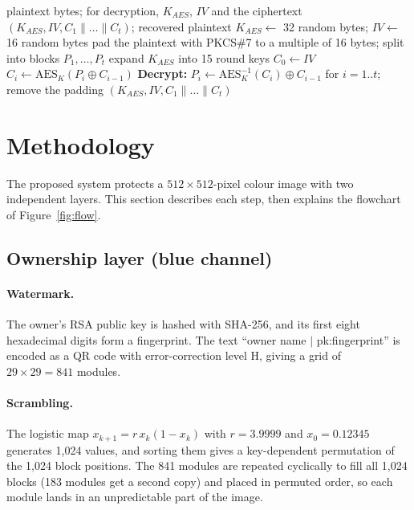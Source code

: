 \documentclass[11pt,a4paper]{article}
\begin{document}
\begin{algorithm}[!htbp]
\caption{AES-256-CBC encryption and decryption}\label{alg:aes}
\begin{algorithmic}[1]
\Require plaintext bytes; for decryption, $K_{AES}$, $IV$ and the ciphertext
\Ensure $(K_{AES}, IV, C_1\|\dots\|C_t)$; recovered plaintext
\State $K_{AES}\gets$ 32 random bytes; \quad $IV\gets$ 16 random bytes
\State pad the plaintext with PKCS\#7 to a multiple of 16 bytes; split into blocks $P_1,\dots,P_t$
\State expand $K_{AES}$ into 15 round keys 
\State $C_0\gets IV$
  \State $C_i\gets\mathrm{AES}_{K}(P_i\oplus C_{i-1})$ 
\EndFor
\State \textbf{Decrypt:} $P_i\gets\mathrm{AES}^{-1}_{K}(C_i)\oplus C_{i-1}$ for $i=1..t$; remove the padding
\State \Return $(K_{AES}, IV, C_1\|\dots\|C_t)$
\end{algorithmic}
\end{algorithm}

\section{Methodology}\label{sec:method}

The proposed system protects a $512\times512$-pixel colour image with two independent layers. This section describes each step, then explains the flowchart of Figure~\ref{fig:flow}.

\subsection{Ownership layer (blue channel)}

\paragraph{Watermark.} The owner's RSA public key is hashed with SHA-256, and its first eight hexadecimal digits form a fingerprint. The text ``owner name $|$ pk:fingerprint'' is encoded as a QR code with error-correction level H, giving a grid of $29\times29=841$ modules.

\paragraph{Scrambling.} The logistic map $x_{k+1}=r\,x_k(1-x_k)$ with $r=3.9999$ and $x_0=0.12345$~\cite{may1976} generates 1,024 values, and sorting them gives a key-dependent permutation of the 1,024 block positions. The 841 modules are repeated cyclically to fill all 1,024 blocks (183 modules get a second copy) and placed in permuted order, so each module lands in an unpredictable part of the image.
\end{document}
